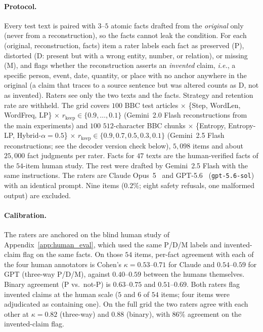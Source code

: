 \documentclass[11pt]{article}
\newcommand{\rkeep}{r_{\mathrm{keep}}}
\begin{document}
\paragraph{Protocol.}
Every test text is paired with $3$--$5$ atomic facts drafted from the \emph{original} only (never from
a reconstruction), so the facts cannot leak the condition. For each (original, reconstruction, facts)
item a rater labels each fact as preserved (P), distorted (D: present but with a wrong entity, number, or
relation), or missing (M), and flags whether the reconstruction asserts an \emph{invented} claim, {\em i.e.}, a
specific person, event, date, quantity, or place with no anchor anywhere in the original (a claim that
traces to a source sentence but was altered counts as D, not as invented). Raters see only the two texts and the facts. Strategy and retention rate are withheld. The grid covers $100$ BBC test articles
$\times$ \{Step, WordLen, WordFreq, LP\} $\times$ $\rkeep\in\{0.9,\dots,0.1\}$ (Gemini~2.0 Flash
reconstructions from the main experiments) and $100$ $512$-character BBC chunks $\times$ \{Entropy,
Entropy-LP, Hybrid-$\alpha{=}0.5$\} $\times$ $\rkeep\in\{0.9,0.7,0.5,0.3,0.1\}$ (Gemini~2.5 Flash
reconstructions; see the decoder version check below), $5{,}098$ items and about $25{,}000$ fact judgments per rater. Facts for $47$ texts are
the human-verified facts of the $54$-item human study. The rest were drafted by Gemini~2.5 Flash with
the same instructions. The raters are Claude Opus~5~\citep{anthropic2026opus5} and GPT-5.6~\citep{openai2026gpt56} (\texttt{gpt-5.6-sol}) with an identical
prompt. Nine items ($0.2\%$; eight safety refusals, one malformed output) are excluded.

\paragraph{Calibration.}
The raters are anchored on the blind human study of Appendix~\ref{app:human_eval}, which used the same
P/D/M labels and invented-claim flag on the same facts. On those $54$ items, per-fact agreement with each of the four human annotators is
Cohen's $\kappa=0.53$--$0.71$ for Claude and $0.54$--$0.59$ for GPT (three-way P/D/M), against
$0.40$--$0.59$ between the humans themselves. Binary agreement (P vs.\ not-P) is $0.63$--$0.75$ and
$0.51$--$0.69$. Both raters flag invented claims at the human scale ($5$ and $6$ of $54$ items; four items
were adjudicated as containing one). On the full grid the two raters agree with each other at
$\kappa=0.82$ (three-way) and $0.88$ (binary), with $86\%$ agreement on the invented-claim flag.
\end{document}
